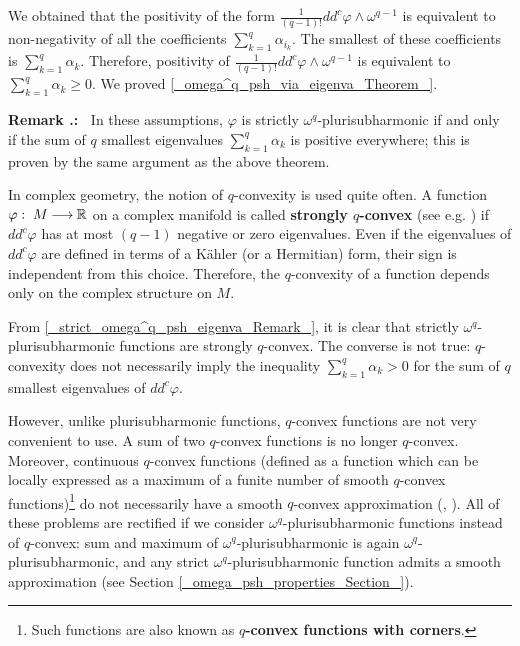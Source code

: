 \documentclass[11pt]{article}
\numberwithin{equation}{section}
\newcommand{\arrow}{{\:\longrightarrow\:}}
\newcommand{\R}{{\Bbb R}}
\newcommand{\6}{\partial}
\renewcommand{\phi}{\varphi}
\renewcommand{\geq}{\geqslant}
\newcounter{Mycounter}[section]
\newcounter{theorem}[section]
\newcounter{remark}[section]
\renewcommand{\theremark}{{Remark \thesection.\arabic{remark}}}
\newcommand{\remark}{%
    \setcounter{remark}{\value{Mycounter}}
    \refstepcounter{remark}
    \stepcounter{Mycounter}
    {\noindent \bf \theremark:\ }}
\newcounter{problem}[section]
\def\blacksquare{\hbox{\vrule width 5pt height 5pt depth 0pt}}
\def\endproof{\blacksquare}
\begin{document}
We obtained that the positivity of the form 
$\frac 1 {(q-1)!} dd^c\phi \wedge \omega^{q-1}$
is equivalent to non-negativity of all the coefficients
$\sum_{k=1}^q \alpha_{i_k}$. The smallest of these
coefficients is $\sum_{k=1}^q \alpha_{k}$.
Therefore, positivity of 
$\frac 1 {(q-1)!} dd^c\phi \wedge \omega^{q-1}$
is equivalent to $\sum_{k=1}^q \alpha_{k}\geq 0$.
We proved \ref{_omega^q_psh_via_eigenva_Theorem_}.
\endproof

\hfill

\remark\label{_strict_omega^q_psh_eigenva_Remark_}
In these assumptions,
$\phi$ is strictly $\omega^q$-plurisubharmonic
if and only if the sum of $q$ smallest
eigenvalues $\sum_{k=1}^q \alpha_{k}$ is positive everywhere; 
this is proven by the same argument as the above theorem. 


\hfill

In complex geometry, the notion of $q$-convexity is 
used quite often. A function $\phi:\; M \arrow \R$
on a complex manifold is called {\bf strongly $q$-convex}
(see e.g. \cite{_Demailly:q-convex_}) if $dd^c\phi$ has at
most $(q-1)$ negative or zero eigenvalues. 
Even if the eigenvalues of $dd^c\phi$ 
are defined in terms of a K\"ahler (or a Hermitian) form,
their sign is independent from this choice. Therefore,
the $q$-convexity of a function depends only on the
complex structure on $M$.

From \ref{_strict_omega^q_psh_eigenva_Remark_},
it is clear that strictly $\omega^q$-plurisubharmonic
functions are strongly $q$-convex. 
The converse is not true: $q$-convexity 
does not necessarily imply the inequality 
$\sum_{k=1}^q \alpha_{k}>0$ for the
sum of $q$ smallest eigenvalues of $dd^c\phi$.

However, unlike plurisubharmonic functions, 
$q$-convex functions are not very convenient to use.
A sum of two $q$-convex functions is
no longer $q$-convex. Moreover, continuous $q$-convex
functions (defined as a function which can be locally
expressed as a maximum of a funite number of smooth
$q$-convex functions)\footnote{Such functions are also
known as {\bf $q$-convex functions with corners}.}
do not necessarily have a smooth $q$-convex approximation
(\cite{_Dieder_Fornae:smoothing_}, \cite{_M_Peternell:contin_q_con_}).
All of these problems are rectified if we consider 
$\omega^q$-plurisubharmonic functions instead of
$q$-convex: sum and maximum
of $\omega^q$-plurisubharmonic is again
$\omega^q$-plurisubharmonic, and any strict
$\omega^q$-\-plu\-ri\-sub\-har\-mo\-nic function admits a smooth
approximation (see Section \ref{_omega_psh_properties_Section_}).
\end{document}
